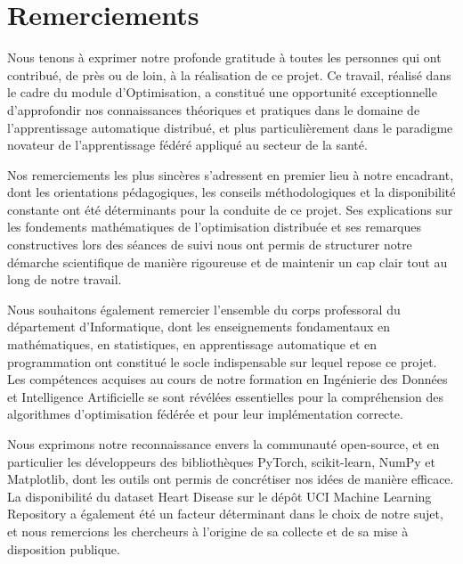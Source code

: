 \documentclass[12pt,a4paper]{report}
\begin{document}
\chapter*{Remerciements}

Nous tenons \`{a} exprimer notre profonde gratitude \`{a} toutes les personnes qui ont contribu\'{e}, de pr\`{e}s ou de loin, \`{a} la r\'{e}alisation de ce projet. Ce travail, r\'{e}alis\'{e} dans le cadre du module d'Optimisation, a constitu\'{e} une opportunit\'{e} exceptionnelle d'approfondir nos connaissances th\'{e}oriques et pratiques dans le domaine de l'apprentissage automatique distribu\'{e}, et plus particuli\`{e}rement dans le paradigme novateur de l'apprentissage f\'{e}d\'{e}r\'{e} appliqu\'{e} au secteur de la sant\'{e}.

Nos remerciements les plus sinc\`{e}res s'adressent en premier lieu \`{a} notre encadrant, dont les orientations p\'{e}dagogiques, les conseils m\'{e}thodologiques et la disponibilit\'{e} constante ont \'{e}t\'{e} d\'{e}terminants pour la conduite de ce projet. Ses explications sur les fondements math\'{e}matiques de l'optimisation distribu\'{e}e et ses remarques constructives lors des s\'{e}ances de suivi nous ont permis de structurer notre d\'{e}marche scientifique de mani\`{e}re rigoureuse et de maintenir un cap clair tout au long de notre travail.

Nous souhaitons \'{e}galement remercier l'ensemble du corps professoral du d\'{e}partement d'Informatique, dont les enseignements fondamentaux en math\'{e}matiques, en statistiques, en apprentissage automatique et en programmation ont constitu\'{e} le socle indispensable sur lequel repose ce projet. Les comp\'{e}tences acquises au cours de notre formation en Ing\'{e}nierie des Donn\'{e}es et Intelligence Artificielle se sont r\'{e}v\'{e}l\'{e}es essentielles pour la compr\'{e}hension des algorithmes d'optimisation f\'{e}d\'{e}r\'{e}e et pour leur impl\'{e}mentation correcte.

Nous exprimons notre reconnaissance envers la communaut\'{e} open-source, et en particulier les d\'{e}veloppeurs des biblioth\`{e}ques PyTorch, scikit-learn, NumPy et Matplotlib, dont les outils ont permis de concr\'{e}tiser nos id\'{e}es de mani\`{e}re efficace. La disponibilit\'{e} du dataset Heart Disease sur le d\'{e}p\^{o}t UCI Machine Learning Repository a \'{e}galement \'{e}t\'{e} un facteur d\'{e}terminant dans le choix de notre sujet, et nous remercions les chercheurs \`{a} l'origine de sa collecte et de sa mise \`{a} disposition publique.
\end{document}
